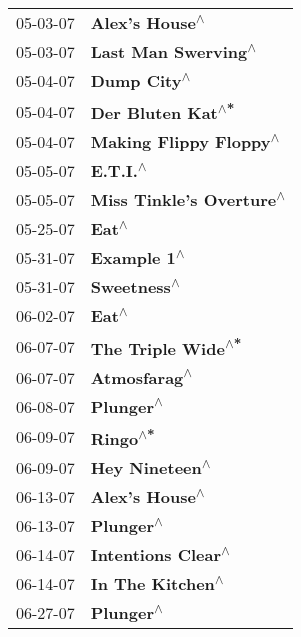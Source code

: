 \begin{supertabular}{p{0.25\columnwidth}p{0.75\columnwidth}}
 05-03-07 &                        \textbf{Alex's House\textsuperscript{$\wedge$}} \\
 05-03-07 &                   \textbf{Last Man Swerving\textsuperscript{$\wedge$}} \\
 05-04-07 &                           \textbf{Dump City\textsuperscript{$\wedge$}} \\
 05-04-07 &                     \textbf{Der Bluten Kat\textsuperscript{$\wedge$*}} \\
 05-04-07 &                \textbf{Making Flippy Floppy\textsuperscript{$\wedge$}} \\
 05-05-07 &                              \textbf{E.T.I.\textsuperscript{$\wedge$}} \\
 05-05-07 &              \textbf{Miss Tinkle's Overture\textsuperscript{$\wedge$}} \\
 05-25-07 &                                 \textbf{Eat\textsuperscript{$\wedge$}} \\
 05-31-07 &                           \textbf{Example 1\textsuperscript{$\wedge$}} \\
 05-31-07 &                           \textbf{Sweetness\textsuperscript{$\wedge$}} \\
 06-02-07 &                                 \textbf{Eat\textsuperscript{$\wedge$}} \\
 06-07-07 &                    \textbf{The Triple Wide\textsuperscript{$\wedge$*}} \\
 06-07-07 &                          \textbf{Atmosfarag\textsuperscript{$\wedge$}} \\
 06-08-07 &                             \textbf{Plunger\textsuperscript{$\wedge$}} \\
 06-09-07 &                              \textbf{Ringo\textsuperscript{$\wedge$*}} \\
 06-09-07 &                        \textbf{Hey Nineteen\textsuperscript{$\wedge$}} \\
 06-13-07 &                        \textbf{Alex's House\textsuperscript{$\wedge$}} \\
 06-13-07 &                             \textbf{Plunger\textsuperscript{$\wedge$}} \\
 06-14-07 &                    \textbf{Intentions Clear\textsuperscript{$\wedge$}} \\
 06-14-07 &                      \textbf{In The Kitchen\textsuperscript{$\wedge$}} \\
 06-27-07 &                             \textbf{Plunger\textsuperscript{$\wedge$}} \\

\end{supertabular}
